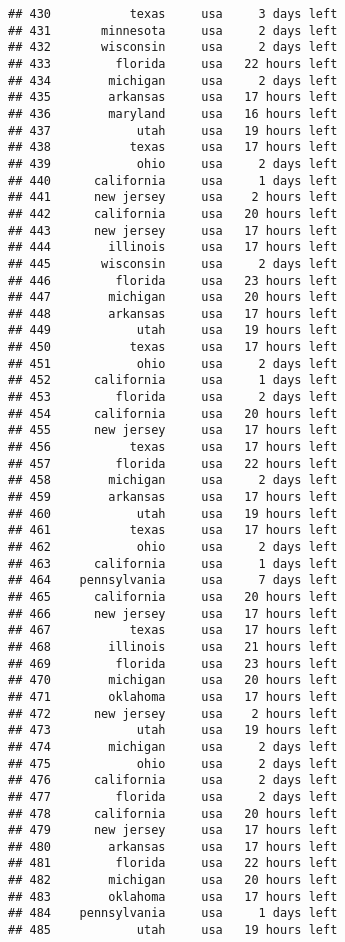 \documentclass[
]{article}
\begin{document}
\begin{verbatim}
## 430           texas     usa     3 days left
## 431       minnesota     usa     2 days left
## 432       wisconsin     usa     2 days left
## 433         florida     usa   22 hours left
## 434        michigan     usa     2 days left
## 435        arkansas     usa   17 hours left
## 436        maryland     usa   16 hours left
## 437            utah     usa   19 hours left
## 438           texas     usa   17 hours left
## 439            ohio     usa     2 days left
## 440      california     usa     1 days left
## 441      new jersey     usa    2 hours left
## 442      california     usa   20 hours left
## 443      new jersey     usa   17 hours left
## 444        illinois     usa   17 hours left
## 445       wisconsin     usa     2 days left
## 446         florida     usa   23 hours left
## 447        michigan     usa   20 hours left
## 448        arkansas     usa   17 hours left
## 449            utah     usa   19 hours left
## 450           texas     usa   17 hours left
## 451            ohio     usa     2 days left
## 452      california     usa     1 days left
## 453         florida     usa     2 days left
## 454      california     usa   20 hours left
## 455      new jersey     usa   17 hours left
## 456           texas     usa   17 hours left
## 457         florida     usa   22 hours left
## 458        michigan     usa     2 days left
## 459        arkansas     usa   17 hours left
## 460            utah     usa   19 hours left
## 461           texas     usa   17 hours left
## 462            ohio     usa     2 days left
## 463      california     usa     1 days left
## 464    pennsylvania     usa     7 days left
## 465      california     usa   20 hours left
## 466      new jersey     usa   17 hours left
## 467           texas     usa   17 hours left
## 468        illinois     usa   21 hours left
## 469         florida     usa   23 hours left
## 470        michigan     usa   20 hours left
## 471        oklahoma     usa   17 hours left
## 472      new jersey     usa    2 hours left
## 473            utah     usa   19 hours left
## 474        michigan     usa     2 days left
## 475            ohio     usa     2 days left
## 476      california     usa     2 days left
## 477         florida     usa     2 days left
## 478      california     usa   20 hours left
## 479      new jersey     usa   17 hours left
## 480        arkansas     usa   17 hours left
## 481         florida     usa   22 hours left
## 482        michigan     usa   20 hours left
## 483        oklahoma     usa   17 hours left
## 484    pennsylvania     usa     1 days left
## 485            utah     usa   19 hours left

\end{verbatim}
\end{document}
